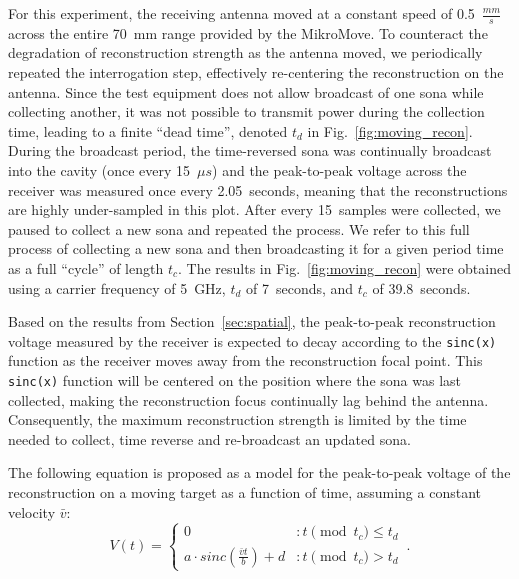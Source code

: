 \documentclass[conference]{IEEEtran}
\begin{document}
For this experiment, the receiving antenna moved at a constant speed of
0.5~$\frac{mm}{s}$ across the entire 70~mm range provided by the MikroMove.
%
To counteract the degradation of reconstruction strength as the antenna moved,
we periodically repeated the interrogation step, effectively re-centering the
reconstruction on the antenna.
%
Since the test equipment does not allow broadcast of one sona while collecting
another, it was not possible to transmit power during the collection time,
leading to a finite ``dead time'', denoted $t_d$ in Fig.~\ref{fig:moving_recon}.
%
During the broadcast period, the time-reversed sona was continually broadcast
into the cavity (once every 15~$\mu s$) and the peak-to-peak voltage across the
receiver was measured once every 2.05~seconds, meaning that the reconstructions
are highly under-sampled in this plot.
%
After every 15~samples were collected, we paused to collect a new sona and
repeated the process. We refer to this full process of collecting a new sona and
then broadcasting it for a given period time as a full ``cycle'' of length
$t_c$.
%
The results in Fig.~\ref{fig:moving_recon} were obtained using a carrier
frequency of 5~GHz, $t_d$ of 7~seconds, and $t_c$ of 39.8~seconds.



Based on the results from Section~\ref{sec:spatial}, the peak-to-peak
reconstruction voltage measured by the receiver is expected to decay according
to the \texttt{sinc(x)} function as the receiver moves away from the
reconstruction focal point.
%
This \texttt{sinc(x)} function will be centered on the position where the sona
was last collected, making the reconstruction focus continually lag behind the
antenna.
%
Consequently, the maximum reconstruction strength is limited by the time needed
to collect, time reverse and re-broadcast an updated sona.



The following equation is proposed as a model for the peak-to-peak voltage of
the reconstruction on a moving target as a function of time, assuming a constant
velocity $\bar{v}$:
%
\begin{equation}\label{eq:vt}
  V(t) = \left\{
        \begin{array}{lr}
                0 & : t\pmod{t_c} \le t_d \\
                a\cdot sinc(\frac{\bar{v}t}{b})+d & : t\pmod{t_c} > t_d
        \end{array}\,.
  \right.
\end{equation}
\end{document}
